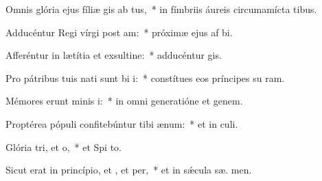\item Omnis glória ejus fíliæ gis ab tus,~* in fímbriis áureis circumamícta tibus.
\item Adducéntur Regi vírgi post am:~* próximæ ejus af bi.
\item Afferéntur in lætítia et exsultine:~* adducéntur   gis.
\item Pro pátribus tuis nati sunt bi i:~* constítues eos príncipes su  ram.
\item Mémores erunt minis i:~* in omni generatióne et genem.
\item Proptérea pópuli confitebúntur tibi  ænum:~* et in  culi.
\item Glória tri, et o,~* et Spi to.
\item Sicut erat in princípio, et , et per,~* et in sǽcula sæ. men.
